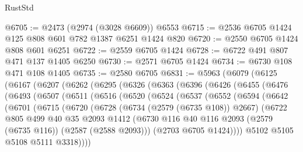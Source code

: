 \begin{lexlean}{RustStd}
\begin{coremodule}
@6705 := @2473 (@2974 (@3028 @6609)) @6553
@6715 := @2536 @6705 @1424 @125 @808 @601 @782 @1387 @6251 @1424 @820
@6720 := @2550 @6705 @1424 @808 @601 @6251
@6722 := @2559 @6705 @1424
@6728 := @6722 @491 @807 @471 @137 @1405 @6250
@6730 := @2571 @6705 @1424
@6734 := @6730 @108 @471 @108 @1405
@6735 := @2580 @6705
@6831 := @5963
    (@6079
      (@6125
        (@6167
          (@6207
            (@6262
              (@6295
                (@6326
                  (@6363
                    (@6396
                      (@6426
                        (@6455
                          (@6476
                            (@6493
                              (@6507
                                (@6511
                                  (@6516
                                    (@6520
                                      (@6524
                                        (@6537
                                          (@6552
                                            (@6594
                                              (@6642
                                                (@6701
                                                  (@6715
                                                    (@6720
                                                      (@6728
                                                        (@6734 (@2579 (@6735 @108)) @2667)
                                                        (@6722
                                                          @805
                                                          @499
                                                          @40
                                                          @35
                                                          @2093
                                                          @1412
                                                          (@6730
                                                            @116
                                                            @40
                                                            @116
                                                            @2093
                                                            (@2579 (@6735 @116))
                                                            (@2587 (@2588 @2093)))
                                                          (@2703 @6705 @1424))))
                                                    @5102
                                                    @5105
                                                    @5108
                                                    @5111
                                                    @3318))))

\end{coremodule}
\end{lexlean}
